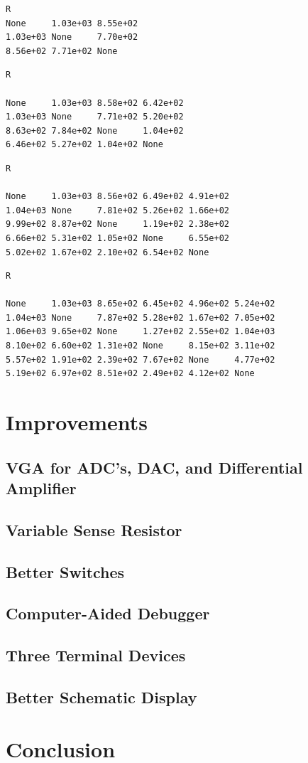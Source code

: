 \documentclass[11pt,twoside]{mitthesis}
\begin{document}
\begin{Verbatim}[fontsize=\footnotesize]
R
None     1.03e+03 8.55e+02  
1.03e+03 None     7.70e+02  
8.56e+02 7.71e+02 None  
\end{Verbatim}


\begin{Verbatim}[fontsize=\footnotesize]
R

None     1.03e+03 8.58e+02 6.42e+02  
1.03e+03 None     7.71e+02 5.20e+02  
8.63e+02 7.84e+02 None     1.04e+02  
6.46e+02 5.27e+02 1.04e+02 None      
\end{Verbatim}

\begin{Verbatim}[fontsize=\footnotesize]
R

None     1.03e+03 8.56e+02 6.49e+02 4.91e+02  
1.04e+03 None     7.81e+02 5.26e+02 1.66e+02  
9.99e+02 8.87e+02 None     1.19e+02 2.38e+02  
6.66e+02 5.31e+02 1.05e+02 None     6.55e+02  
5.02e+02 1.67e+02 2.10e+02 6.54e+02 None 
\end{Verbatim}

\begin{Verbatim}[fontsize=\footnotesize]
R

None     1.03e+03 8.65e+02 6.45e+02 4.96e+02 5.24e+02  
1.04e+03 None     7.87e+02 5.28e+02 1.67e+02 7.05e+02  
1.06e+03 9.65e+02 None     1.27e+02 2.55e+02 1.04e+03  
8.10e+02 6.60e+02 1.31e+02 None     8.15e+02 3.11e+02  
5.57e+02 1.91e+02 2.39e+02 7.67e+02 None     4.77e+02  
5.19e+02 6.97e+02 8.51e+02 2.49e+02 4.12e+02 None     
\end{Verbatim}

\section{Improvements}
\subsection{VGA for ADC's, DAC, and Differential Amplifier}
\subsection{Variable Sense Resistor}
\subsection{Better Switches}
\subsection{Computer-Aided Debugger}
\subsection{Three Terminal Devices}
\subsection{Better Schematic Display}

\section{Conclusion}
\ifdefined\DEBUG
\end{document}
